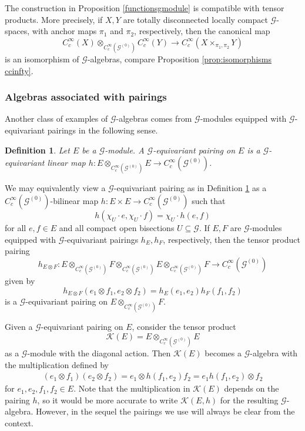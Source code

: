 \documentclass{amsart}
\newtheorem{dfn}[thm]{Definition}
\newcommand{\G}{\mathcal{G}}
\newcommand{\K}{\mathcal{K}}
\newcommand{\ccinfty}{C_c^\infty}
\begin{document}
The construction in Proposition \ref{functionsgmodule} is compatible with tensor products. More precisely, if $ X, Y $ are totally disconnected locally compact $ \G $-spaces, with anchor maps $\pi_1$ and $\pi_2$, respectively, then 
the canonical map 
$$
\ccinfty(X) \otimes_{\ccinfty(\G^{(0)})} \ccinfty(Y) \rightarrow \ccinfty(X \times_{\pi_1,\pi_2} Y) 
$$
is an isomorphism of $ \G $-algebras, compare Proposition \ref{prop:isomorphisms ccinfty}.  

\subsubsection{Algebras associated with pairings} 

Another class of examples of $ \G $-algebras comes from $ \G $-modules equipped with $ \G $-equivariant pairings in the following sense. 

\begin{dfn} \label{defpairing}
Let $ E $ be a $ \G $-module. A $ \G $-equivariant pairing on $ E $ is a $ \G $-equivariant linear map $ h: E \otimes_{\ccinfty(\G^{(0)})} E \rightarrow \ccinfty(\G^{(0)}) $. 
\end{dfn}

We may equivalently view a $ \G $-equivariant pairing as in Definition \ref{defpairing} as a $ \ccinfty(\G^{(0)}) $-bilinear map $ h: E \times E \rightarrow \ccinfty(\G^{(0)}) $ such that 
$$
h(\chi_U \cdot e, \chi_U \cdot f) = \chi_U \cdot h(e,f)
$$
for all $ e,f \in E $ and all compact open bisections $ U \subseteq \G $. If $ E,F $ are $ \G $-modules equipped with $ \G $-equivariant pairings $ h_E, h_F $, respectively, then the tensor product pairing 
$$
h_{E \otimes F}: E \otimes_{\ccinfty(\G^{(0)})} F \otimes_{\ccinfty(\G^{(0)})} E \otimes_{\ccinfty(\G^{(0)})} F \rightarrow \ccinfty(\G^{(0)})
$$
given by 
$$
h_{E \otimes F}(e_1 \otimes f_1, e_2 \otimes f_2) = h_E(e_1, e_2) h_F(f_1, f_2) 
$$
is a $ \G $-equivariant pairing on $ E \otimes_{\ccinfty(\G^{(0)})} F $. 

Given a $ \G $-equivariant pairing on $ E $, consider the tensor product 
$$ 
\K(E) = E \otimes_{\ccinfty(\G^{(0)})} E 
$$ 
as a $ \G $-module with the diagonal action. Then $ \K(E) $ becomes a $ \G $-algebra with the multiplication defined by
\begin{align*} 
(e_1 \otimes f_1) (e_2 \otimes f_2) = e_1 \otimes h(f_1, e_2) f_2 = e_1 h(f_1, e_2) \otimes f_2
\end{align*} 
for $ e_1, e_2, f_1, f_2 \in E $. Note that the multiplication in $ \K(E) $ depends on the pairing $ h $, so it would be more accurate to write $ \K(E, h) $ for the resulting $ \G $-algebra. However, in the sequel the pairings we use will always be clear from the context. 
\end{document}

